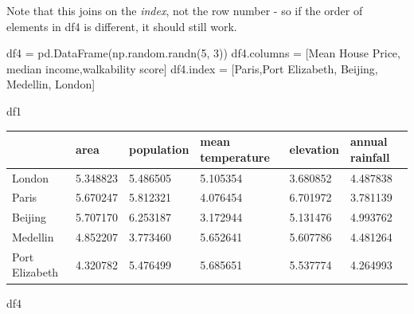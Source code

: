 \documentclass[
  letterpaper,
  DIV=11,
  numbers=noendperiod]{scrreprt}
\newenvironment{Shaded}{\begin{snugshade}}{\end{snugshade}}
\newcommand{\DecValTok}[1]{\textcolor[rgb]{0.68,0.00,0.00}{#1}}
\newcommand{\NormalTok}[1]{\textcolor[rgb]{0.00,0.23,0.31}{#1}}
\newcommand{\OperatorTok}[1]{\textcolor[rgb]{0.37,0.37,0.37}{#1}}
\newcommand{\StringTok}[1]{\textcolor[rgb]{0.13,0.47,0.30}{#1}}
\begin{document}
Note that this joins on the \emph{index}, not the row number - so if the
order of elements in df4 is different, it should still work.

\begin{Shaded}
\begin{Highlighting}[]
\NormalTok{df4 }\OperatorTok{=}\NormalTok{ pd.DataFrame(np.random.randn(}\DecValTok{5}\NormalTok{, }\DecValTok{3}\NormalTok{))}
\NormalTok{df4.columns }\OperatorTok{=}\NormalTok{ [}\StringTok{\textquotesingle{}Mean House Price\textquotesingle{}}\NormalTok{, }\StringTok{\textquotesingle{}median income\textquotesingle{}}\NormalTok{,}\StringTok{\textquotesingle{}walkability score\textquotesingle{}}\NormalTok{]}
\NormalTok{df4.index }\OperatorTok{=}\NormalTok{ [}\StringTok{\textquotesingle{}Paris\textquotesingle{}}\NormalTok{,}\StringTok{\textquotesingle{}Port Elizabeth\textquotesingle{}}\NormalTok{, }\StringTok{\textquotesingle{}Beijing\textquotesingle{}}\NormalTok{, }\StringTok{\textquotesingle{}Medellin\textquotesingle{}}\NormalTok{, }\StringTok{\textquotesingle{}London\textquotesingle{}}\NormalTok{]}
\end{Highlighting}
\end{Shaded}

\begin{Shaded}
\begin{Highlighting}[]
\NormalTok{df1}
\end{Highlighting}
\end{Shaded}

\begin{longtable}[]{@{}llllll@{}}
\toprule()
& area & population & mean temperature & elevation & annual rainfall \\
\midrule()
\endhead
London & 5.348823 & 5.486505 & 5.105354 & 3.680852 & 4.487838 \\
Paris & 5.670247 & 5.812321 & 4.076454 & 6.701972 & 3.781139 \\
Beijing & 5.707170 & 6.253187 & 3.172944 & 5.131476 & 4.993762 \\
Medellin & 4.852207 & 3.773460 & 5.652641 & 5.607786 & 4.481264 \\
Port Elizabeth & 4.320782 & 5.476499 & 5.685651 & 5.537774 & 4.264993 \\
\bottomrule()
\end{longtable}

\begin{Shaded}
\begin{Highlighting}[]
\NormalTok{df4}
\end{Highlighting}
\end{Shaded}
\end{document}
